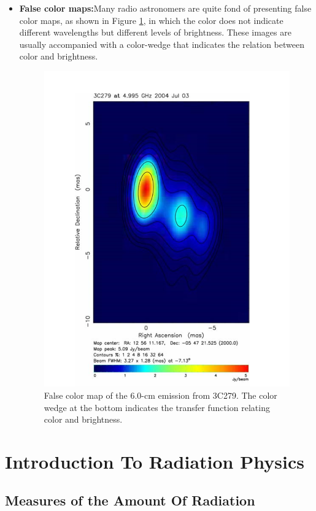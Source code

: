 \documentclass[10pt]{report}
\begin{document}
\begin{itemize}
\item \textbf{False color maps:}Many radio astronomers are quite fond of presenting false color maps, as shown in Figure \ref{figfal}, in which the color does not indicate different wavelengths but different levels of brightness. These images are usually accompanied with a color-wedge that indicates the relation between color and brightness. 
\begin{figure}\label{figfal}
\includegraphics[scale=1]{figfal.png}
\caption{ False color map of the 6.0-cm emission from 3C279.  The color wedge at the bottom indicates the transfer function relating color and brightness.}
\end{figure}
 
\end{itemize}

\chapter{Introduction To Radiation Physics}
\section{Measures of the Amount Of Radiation}
\end{document}
